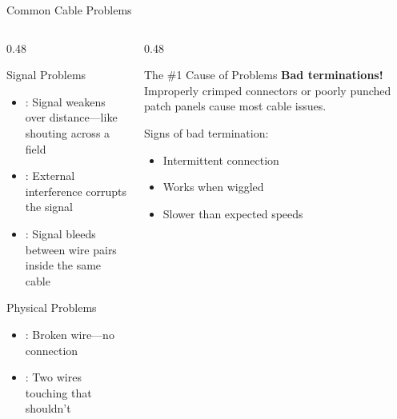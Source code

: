 \documentclass[aspectratio=169]{beamer}  %
\begin{document}
\begin{frame}{Common Cable Problems}
    \begin{columns}[T]
        \begin{column}{0.48\textwidth}
            \begin{block}{Signal Problems}
                \begin{itemize}
                    \item {}: Signal weakens over distance---like shouting across a field
                    \item {}: External interference corrupts the signal
                    \item {}: Signal bleeds between wire pairs inside the same cable
                \end{itemize}
            \end{block}
            
            \vspace{0.3em}
            \begin{block}{Physical Problems}
                \begin{itemize}
                    \item {}: Broken wire---no connection
                    \item {}: Two wires touching that shouldn't
                \end{itemize}
            \end{block}
        \end{column}
        \begin{column}{0.48\textwidth}
            \begin{alertblock}{The \#1 Cause of Problems}
                \textbf{Bad terminations!} Improperly crimped connectors or poorly punched patch panels cause most cable issues.
                
                \vspace{0.3em}
                Signs of bad termination:
                \begin{itemize}
                    \item Intermittent connection
                    \item Works when wiggled
                    \item Slower than expected speeds
                \end{itemize}
            \end{alertblock}
        \end{column}

    \vspace{0.3em}
    \end{columns}
    

\end{frame}
\end{document}
